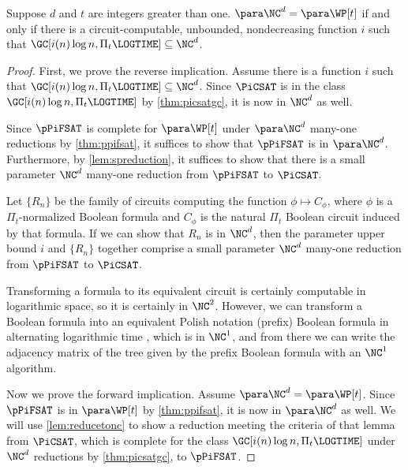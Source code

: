 \begin{theorem}\label{thm:ncwnct}
  Suppose $d$ and $t$ are integers greater than one.
  $\para \NC^d = \para \WP[t]$ if and only if there is a circuit-computable, unbounded, nondecreasing function $i$ such that %
  $\GC[i(n) \log n, \Pi_t \LOGTIME] \subseteq \NC^d$.
\end{theorem}
\begin{proof}
  First, we prove the reverse implication.
  Assume there is a function $i$ such that $\GC[i(n) \log n, \Pi_t \LOGTIME] \subseteq \NC^d$.
  Since $\PiCSAT$ is in the class $\GC[i(n) \log n, \Pi_t \LOGTIME]$ by \autoref{thm:picsatgc}, it is now in $\NC^d$ as well.

  Since $\pPiFSAT$ is complete for $\para \WP[t]$ under $\para \NC^d$ many-one reductions by \autoref{thm:ppifsat}, it suffices to show that $\pPiFSAT$ is in $\para \NC^d$.
  Furthermore, by \autoref{lem:spreduction}, it suffices to show that there is a small parameter $\NC^d$ many-one reduction from $\pPiFSAT$ to $\PiCSAT$.

  Let $\{R_n\}$ be the family of circuits computing the function $\phi \mapsto C_\phi$, where $\phi$ is a $\Pi_t$-normalized Boolean formula and $C_\phi$ is the natural $\Pi_t$ Boolean circuit induced by that formula.
  If we can show that $R_n$ is in $\NC^d$, then the parameter upper bound $i$ and $\{R_n\}$ together comprise a small parameter $\NC^d$ many-one reduction from $\pPiFSAT$ to $\PiCSAT$.

  Transforming a formula to its equivalent circuit is certainly computable in logarithmic space, so it is certainly in $\NC^2$.
  However, we can transform a Boolean formula into an equivalent Polish notation (prefix) Boolean formula in alternating logarithmic time \autocite{buss87}, which is in $\NC^1$, and from there we can write the adjacency matrix of the tree given by the prefix Boolean formula with an $\NC^1$ algorithm.

  Now we prove the forward implication.
  Assume $\para \NC^d = \para \WP[t]$.
  Since $\pPiFSAT$ is in $\para \WP[t]$ by \autoref{thm:ppifsat}, it is now in $\para \NC^d$ as well.
  We will use \autoref{lem:reducetonc} to show a reduction meeting the criteria of that lemma from $\PiCSAT$, which is complete for the class $\GC[i(n) \log n, \Pi_t \LOGTIME]$ under $\NC^d$ reductions by \autoref{thm:picsatgc}, to $\pPiFSAT$.


\end{proof}
